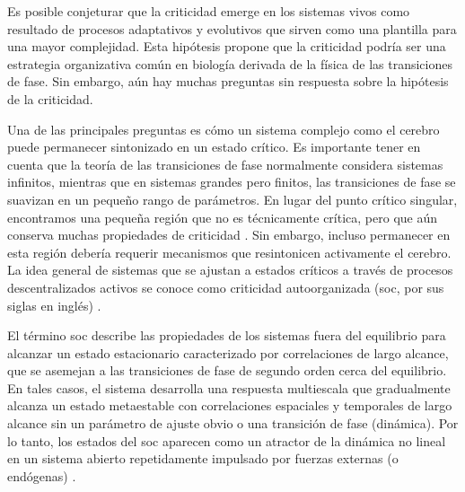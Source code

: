 Es posible conjeturar que la criticidad emerge en los sistemas vivos como resultado de procesos adaptativos y evolutivos que sirven como una plantilla para una mayor complejidad. Esta hipótesis propone que la criticidad podría ser una estrategia organizativa común en biología derivada de la física de las transiciones de fase. Sin embargo, aún hay muchas preguntas sin respuesta sobre la hipótesis de la criticidad.

Una de las principales preguntas es cómo un sistema complejo como el cerebro puede permanecer sintonizado en un estado crítico. Es importante tener en cuenta que la teoría de las transiciones de fase normalmente considera sistemas infinitos, mientras que en sistemas grandes pero finitos, las transiciones de fase se suavizan en un pequeño rango de parámetros. En lugar del punto crítico singular, encontramos una pequeña región que no es técnicamente crítica, pero que aún conserva muchas propiedades de criticidad \cite{moretti_griffiths_2013}. Sin embargo, incluso permanecer en esta región   debería requerir mecanismos que resintonicen activamente el cerebro. La idea general de sistemas que se ajustan a estados críticos a través de procesos descentralizados activos se conoce como criticidad autoorganizada (\gls{soc}, por sus siglas en inglés) \cite{bak_how_1996,christensen_evolution_1998,bornholdt_topological_2000,bornholdt_self-organized_2003}.

El término \gls{soc}  describe las propiedades de los sistemas fuera del equilibrio para alcanzar un estado estacionario caracterizado por correlaciones de largo alcance, que se asemejan a las transiciones de fase de segundo orden cerca del equilibrio. En tales casos, el sistema desarrolla una respuesta multiescala que gradualmente alcanza un estado metaestable con correlaciones espaciales y temporales de largo alcance sin un parámetro de ajuste obvio o una transición de fase (dinámica). Por lo tanto, los estados del  \gls{soc} aparecen como un atractor de la dinámica no lineal en un sistema abierto repetidamente impulsado por fuerzas externas (o endógenas) \cite{tadic_self-organised_2021,gross_adaptive_2007}. 

